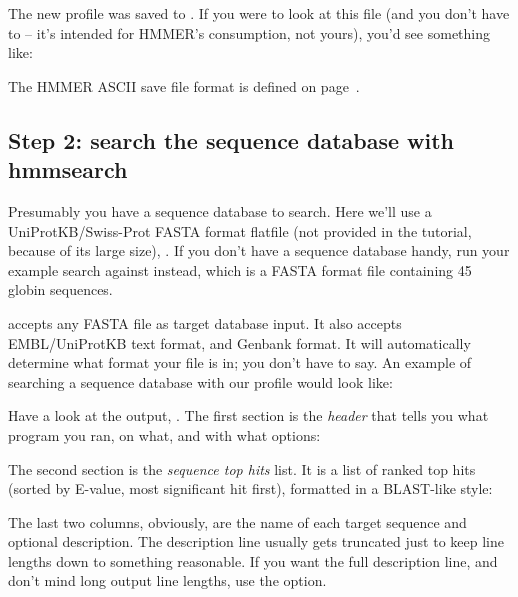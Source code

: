 The new profile was saved to . If you were to look at
this file (and you don't have to -- it's intended for HMMER's
consumption, not yours), you'd see something like:


The HMMER ASCII save file format is defined on
page~\pageref{section:savefiles}.



\subsection{Step 2: search the sequence database with hmmsearch}

Presumably you have a sequence database to search. Here we'll use a
UniProtKB/Swiss-Prot FASTA format flatfile (not provided in the
tutorial, because of its large size), .  If
you don't have a sequence database handy, run your example search
against  instead, which is a FASTA format file
containing 45 globin sequences.

 accepts any FASTA file as target database input. It
also accepts EMBL/UniProtKB text format, and Genbank format. It will
automatically determine what format your file is in; you don't have to
say. An example of searching a sequence database with our
 profile would look like:

   \vspace{1ex}
   \vspace{1ex}

Have a look at the output, .  The first section is
the \emph{header} that tells you what program you ran, on what, and
with what options:


The second section is the \emph{sequence top hits} list. It is a list
of ranked top hits (sorted by E-value, most significant hit first),
formatted in a BLAST-like style:


The last two columns, obviously, are the name of each target sequence
and optional description. The description line usually gets truncated
just to keep line lengths down to something reasonable. If you want
the full description line, and don't mind long output line lengths,
use the  option.

